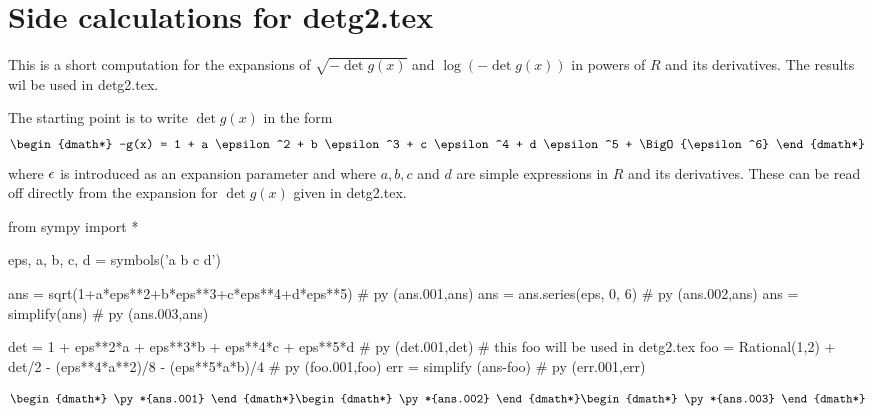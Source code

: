 \documentclass[12pt]{pylatex}
\begin{document}
\section*{Side calculations for detg2.tex}

This is a short computation for the expansions of $\sqrt{-\det g(x)}$ and $\log\left(-\det g(x)\right)$
in powers of $R$ and its derivatives. The results wil be used in {\tts detg2.tex}.

The starting point is to write $\det g(x)$ in the form
\begin{dgroup*}
   \begin{dmath*} -g(x) = 1 + a \epsilon^2 + b \epsilon^3 + c \epsilon^4 + d \epsilon^5 + \BigO{\epsilon^6} \end{dmath*}
\end{dgroup*}
where $\epsilon$ is introduced as an expansion parameter and where $a,b,c$ and $d$
are simple expressions in $R$ and its derivatives. These can be read off directly
from the expansion for $\det g(x)$ given in {\tts detg2.tex}.

\clearpage

\begin{python}
   from sympy import *

   eps, a, b, c, d = symbols('\epsilon a b c d')


   ans = sqrt(1+a*eps**2+b*eps**3+c*eps**4+d*eps**5)   # py (ans.001,ans)
   ans = ans.series(eps, 0, 6)                         # py (ans.002,ans)
   ans = simplify(ans)                                 # py (ans.003,ans)

   det = 1 + eps**2*a + eps**3*b + eps**4*c + eps**5*d   # py (det.001,det)
   # this foo will be used in detg2.tex
   foo = Rational(1,2) + det/2 - (eps**4*a**2)/8 - (eps**5*a*b)/4   # py (foo.001,foo)
   err = simplify (ans-foo)   # py (err.001,err)

\end{python}

\begin{dgroup*}
   \begin{dmath*} \py*{ans.001} \end{dmath*}
   \begin{dmath*} \py*{ans.002} \end{dmath*}
   \begin{dmath*} \py*{ans.003} \end{dmath*}
\end{dgroup*}
\end{document}
